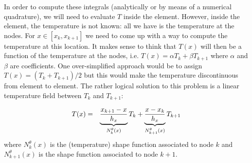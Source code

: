 In order to compute these integrals (analytically or by means of a numerical quadrature), 
we will need to evaluate $T$ inside the element. However, inside the element, 
the temperature is not known: all we have is the temperature at the nodes. 
For $x\in [x_k,x_{k+1}]$ we need to come up with a way to compute the temperature at this location. 
It makes sense to think that $T(x)$ will then be a function of the temperature at the nodes, 
i.e. $T(x) = \alpha T_k + \beta T_{k+1}$ where $\alpha$ and $\beta$ are coefficients. 
One over-simplified approach would be to assign $T(x)=(T_k + T_{k+1})/2$ but this would make the
temperature discontinuous from element to element. 
The rather logical solution to this problem is a linear temperature field between $T_k$
and $T_{k+1}$: 

\begin{eqnarray}
T(x) 
&=& \underbrace{\frac{x_{k+1}-x}{h_x}}_{N_k^\theta(x)} T_k 
+ 
\underbrace{\frac{x-x_k}{h_x}}_{N_{k+1}^\theta(x)} T_{k+1} \nonumber
\end{eqnarray}
where $N_k^\theta(x)$ is the (temperature) shape function associated to node $k$ and 
$N_{k+1}^\theta(x)$ is the shape function associated to node $k+1$.

